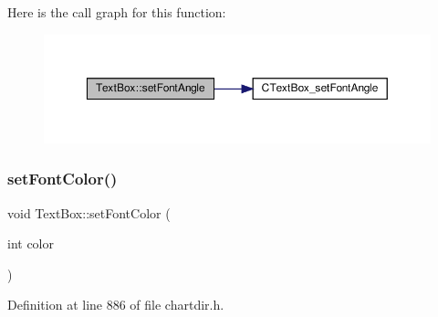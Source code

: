 Here is the call graph for this function\+:
\nopagebreak
\begin{figure}[H]
\begin{center}
\leavevmode
\includegraphics[width=350pt]{class_text_box_a30feafdb422cdad2c53a3dc63a1f8d91_cgraph}
\end{center}
\end{figure}
\mbox{\label{class_text_box_a991aea7906f9a570f47804b35206fe3a}} 
\subsubsection{\texorpdfstring{set\+Font\+Color()}{setFontColor()}}
{\footnotesize\ttfamily void Text\+Box\+::set\+Font\+Color (\begin{DoxyParamCaption}\item[{int}]{color }\end{DoxyParamCaption})\hspace{0.3cm}{\ttfamily [inline]}}



Definition at line 886 of file chartdir.\+h.

